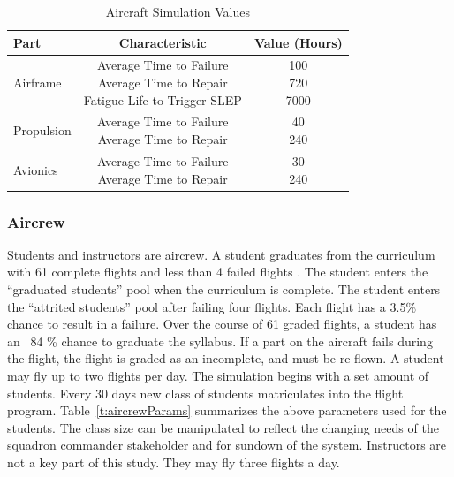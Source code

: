 \documentclass[preprint,12pt]{elsarticle}
\begin{document}
\begin{table}[h]
  \caption{Aircraft Simulation Values}
  \label{t:PartSettings}
  \begin{center}
  \begin{tabular}{l c c}
    \hline
    \hline
    \textbf{Part} & \textbf{Characteristic} & \textbf{Value (Hours)} \\
    \hline
    Airframe & \makecell{ Average Time to Failure \\ Average Time to
      Repair \\ Fatigue Life to Trigger SLEP}  &
    \makecell{ 100 \\ 720 \\ 7000} \\
    \hline
    Propulsion & \makecell{ Average Time to Failure \\ Average Time to
      Repair}  &
    \makecell{ 40 \\ 240 \\ } \\
    \hline
    Avionics & \makecell{ Average Time to Failure \\ Average Time to
      Repair}  &
    \makecell{ 30 \\ 240 \\ } \\
    \hline
  \end{tabular}
  \end{center}
\end{table}



\subsubsection{Aircrew}

Students and instructors are aircrew.  A
student graduates from the curriculum with 61 complete flights and
less than 4 failed 
flights \cite{Air2009}. The student enters the ``graduated students''
pool when the curriculum is complete. The student enters the
``attrited students'' pool after failing four flights. Each flight has
a 3.5\% chance to result in a failure. Over the course of 61 graded
flights, a student has an ~84 \% chance to graduate the syllabus. If a
part on the aircraft fails during the flight, the 
flight is graded as an incomplete, and must be re-flown. A student may
fly up to two flights per day. The simulation begins with a set
amount of students. Every 30 days new class of students
matriculates into the flight program. Table~\ref{t:aircrewParams}
summarizes the above parameters used for the students. The class size
can be manipulated to reflect the changing needs of the squadron
commander stakeholder and for sundown of the system. Instructors are
not a key part of this study. They may fly three flights a
day. 
\end{document}
